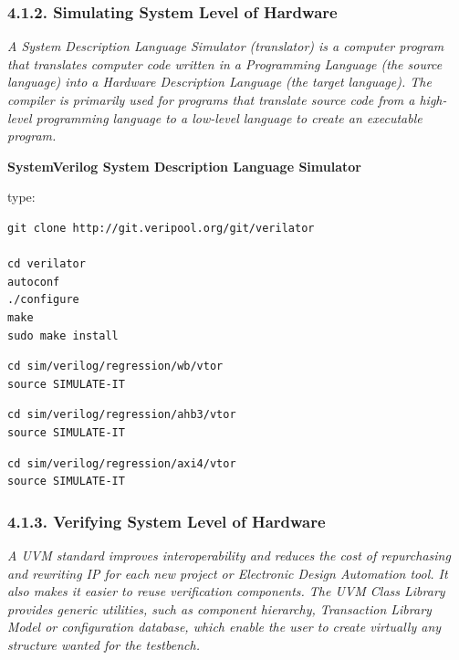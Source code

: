 \documentclass[
]{article}
\begin{document}
\hypertarget{simulating-system-level-of-hardware}{%
\subsubsection{4.1.2. Simulating System Level of
Hardware}\label{simulating-system-level-of-hardware}}

\emph{A System Description Language Simulator (translator) is a computer
program that translates computer code written in a Programming Language
(the source language) into a Hardware Description Language (the target
language). The compiler is primarily used for programs that translate
source code from a high-level programming language to a low-level
language to create an executable program.}

\textbf{SystemVerilog System Description Language Simulator}

type:

\begin{verbatim}
git clone http://git.veripool.org/git/verilator

cd verilator
autoconf
./configure
make
sudo make install
\end{verbatim}

\begin{verbatim}
cd sim/verilog/regression/wb/vtor
source SIMULATE-IT
\end{verbatim}

\begin{verbatim}
cd sim/verilog/regression/ahb3/vtor
source SIMULATE-IT
\end{verbatim}

\begin{verbatim}
cd sim/verilog/regression/axi4/vtor
source SIMULATE-IT
\end{verbatim}

\hypertarget{verifying-system-level-of-hardware}{%
\subsubsection{4.1.3. Verifying System Level of
Hardware}\label{verifying-system-level-of-hardware}}

\emph{A UVM standard improves interoperability and reduces the cost of
repurchasing and rewriting IP for each new project or Electronic Design
Automation tool. It also makes it easier to reuse verification
components. The UVM Class Library provides generic utilities, such as
component hierarchy, Transaction Library Model or configuration
database, which enable the user to create virtually any structure wanted
for the testbench.}
\end{document}

